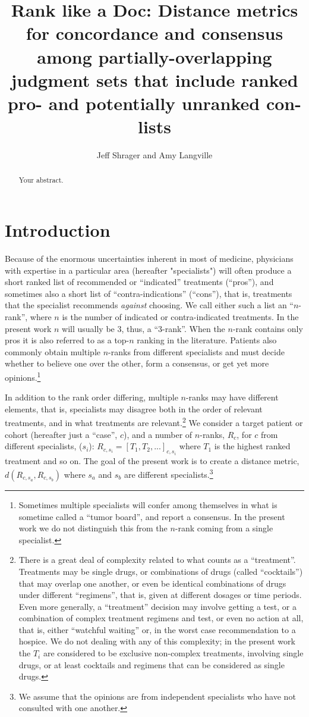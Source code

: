 \documentclass{article}
\title{Rank like a Doc: Distance metrics for concordance and consensus among partially-overlapping judgment sets that include ranked pro- and potentially unranked con- lists}
\author{Jeff Shrager and Amy Langville}
\begin{document}
\maketitle

\begin{abstract}
Your abstract.
\end{abstract}

\section{Introduction}

Because of the enormous uncertainties inherent in most of medicine, physicians with expertise in a particular area (hereafter "specialists") will often produce a short ranked list of recommended or ``indicated'' treatments (``pros''), and sometimes also a short list of ``contra-indications'' (``cons''), that is, treatments that the specialist recommends \textit{against} choosing. We call either such a list an ``$n$-rank'', where $n$ is the number of indicated or contra-indicated treatments. In the present work $n$ will usually be $3$, thus, a ``3-rank''. When the $n$-rank contains only pros it is also referred to as a top-$n$ ranking in the literature. Patients also commonly obtain multiple $n$-ranks from different specialists and must decide whether to believe one over the other, form a consensus, or get yet more opinions.\footnote{Sometimes multiple specialists will confer among themselves in what is sometime called a ``tumor board'', and report a consensus. In the present work we do not distinguish this from the $n$-rank coming from a single specialist.} 

In addition to the rank order differing, multiple $n$-ranks may have different elements, that is, specialists may disagree both in the order of relevant treatments, and in what treatments are relevant.\footnote{There is a great deal of complexity related to what counts as a ``treatment''. Treatments may be single drugs, or combinations of drugs (called ``cocktails'') that may overlap one another, or even be identical combinations of drugs under different ``regimens'', that is, given at different dosages or time periods. Even more generally, a ``treatment'' decision may involve getting a test, or a combination of complex treatment regimens and test, or even no action at all, that is, either ``watchful waiting'' or, in the worst case recommendation to a hospice. We do not dealing with any of this complexity; in the present work the $T_i$ are considered to be exclusive non-complex treatments, involving single drugs, or at least cocktails and regimens that can be considered as single drugs.} We consider a target patient or cohort (hereafter just a ``case'', $c$), and a number of $n$-ranks, $R_c$, for $c$ from different specialists, ($s_i$): $R_{c,s_i}=[T_1, T_2, ...]_{c,s_i}$ where $T_1$ is the highest ranked treatment and so on. The goal of the present work is to create a distance metric, $d(R_{c,s_a},R_{c,s_b})$ where $s_a$ and $s_b$ are different specialists.\footnote{We assume that the opinions are from independent specialists who have not consulted with one another.} 
\end{document}
